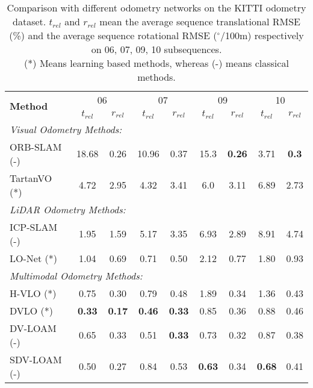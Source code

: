 \begin{table*}[t]
  \centering
  \caption{Comparison with different odometry networks on the KITTI odometry dataset. $t_{rel}$ and $r_{rel}$ mean the average sequence translational RMSE (\%) and the average sequence rotational RMSE ($^{\circ}$/100m) respectively on 06, 07, 09, 10 subsequences.\\ (*) Means learning based methods, whereas (-) means classical methods.} 

    \begin{tabular}{lllll|cc|cc|cc|cc}
    \toprule
    \multicolumn{5}{l|}{\multirow{2}[0]{*}{\textbf{Method}}} & \multicolumn{2}{c|}{06} & \multicolumn{2}{c|}{07} & \multicolumn{2}{c|}{09} & \multicolumn{2}{c}{10} \\
         &      &      &      &      & $t_{rel}$ & $r_{rel}$ & $t_{rel}$ & $r_{rel}$ & $t_{rel}$ & $r_{rel}$ & $t_{rel}$ & $r_{rel}$\\
    \midrule
    \multicolumn{13}{l}{\it{Visual Odometry Methods:}} \\
    \midrule
    \multicolumn{5}{l|}{ORB-SLAM (-)} & 18.68 & 0.26 & 10.96 & 0.37 & 15.3 & \textbf{0.26} & 3.71 & \textbf{0.3}  \\
    \multicolumn{5}{l|}{TartanVO (*)} & 4.72 & 2.95 & 4.32 & 3.41 & 6.0 & 3.11 & 6.89 & 2.73 \\
    \midrule
    \multicolumn{13}{l}{\it{LiDAR Odometry Methods:}} \\
    \midrule
    \multicolumn{5}{l|}{ICP-SLAM (-)} & 1.95 & 1.59 & 5.17 & 3.35 & 6.93 & 2.89 & 8.91 & 4.74  \\
    \multicolumn{5}{l|}{LO-Net (*)} & 1.04 & 0.69 & 0.71 & 0.50 & 2.12 & 0.77 & 1.80 & 0.93 \\
    \midrule
    \multicolumn{13}{l}{\it{Multimodal Odometry Methods:}} \\
    \midrule
    \multicolumn{5}{l|}{H-VLO (*)} & 0.75 & 0.30 & 0.79 & 0.48 & 1.89 & 0.34 & 1.36 & 0.43 \\
    \multicolumn{5}{l|}{DVLO (*)} & \textbf{0.33} & \textbf{0.17} & \textbf{0.46} & \textbf{0.33} & 0.85 & 0.36 & 0.88 & 0.46 \\
    \multicolumn{5}{l|}{DV-LOAM (-)} & 0.65 & 0.33 & 0.51 & \textbf{0.33} & 0.73 & 0.32 & 0.87 & 0.38 \\
    \multicolumn{5}{l|}{SDV-LOAM (-)} & 0.50 & 0.27 & 0.84 & 0.53 & \textbf{0.63} & 0.34 & \textbf{0.68} & 0.41 \\
    \midrule
    
    \bottomrule
    \end{tabular}%
  \label{tab:evaluation_06_10}%
\end{table*}
